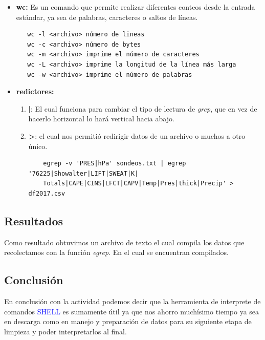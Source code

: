 \documentclass[12pt,letterpaper]{article}
\begin{document}
            \begin{itemize}
            \item\textbf{wc:} Es un comando que permite realizar diferentes conteos desde la entrada estándar, ya sea de palabras, caracteres o saltos de líneas. 
            \begin{verbatim}
   wc -l <archivo> número de lineas 
   wc -c <archivo> número de bytes
   wc -m <archivo> imprime el número de caracteres
   wc -L <archivo> imprime la longitud de la línea más larga
   wc -w <archivo> imprime el número de palabras
            \end{verbatim}
			\end{itemize}
            \begin{itemize}
            \item \textbf{redictores:} 
             \begin{enumerate} 
             	\item\textbf{|}: El cual funciona para cambiar el tipo de lectura de \textsl{grep}, que en vez de hacerlo horizontal lo hará vertical hacia abajo.
                \item \textbf{>}: el cual nos permitió redirigir datos de un archivo o muchos a otro único.
                \begin{verbatim}
	egrep -v 'PRES|hPa' sondeos.txt | egrep '76225|Showalter|LIFT|SWEAT|K|
    Totals|CAPE|CINS|LFCT|CAPV|Temp|Pres|thick|Precip' > df2017.csv
                \end{verbatim}
        	\end{enumerate}

            \end{itemize}

          \subsection{Resultados}
         Como resultado obtuvimos un archivo de texto el cual compila los datos que recolectamos con la función \emph{egrep}. En el cual se encuentran compilados.
          \subsection{Conclusión}
          En conclusión con la actividad podemos decir que la herramienta de interprete de comandos \textcolor{blue}{SHELL} es sumamente útil ya que nos ahorro muchísimo tiempo ya sea en descarga como en manejo y preparación de datos para su siguiente etapa de limpieza y poder interpretarlos al final. 
\end{document}
